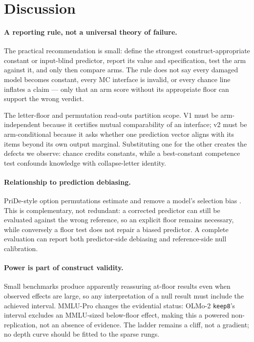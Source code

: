 \section{Discussion}

\paragraph{A reporting rule, not a universal theory of failure.}
The practical recommendation is small: define the strongest construct-appropriate constant or input-blind predictor, report its value and specification, test the arm against it, and only then compare arms. The rule does not say every damaged model becomes constant, every MC interface is invalid, or every chance line inflates a claim --- only that an arm score without its appropriate floor can support the wrong verdict.

The letter-floor and permutation read-outs partition scope. V1 must be arm-independent because it certifies mutual comparability of an interface; v2 must be arm-conditional because it asks whether one prediction vector aligns with its items beyond its own output marginal. Substituting one for the other creates the defects we observe: chance credits constants, while a best-constant competence test confounds knowledge with collapse-letter identity.

\paragraph{Relationship to prediction debiasing.}
PriDe-style option permutations estimate and remove a model's selection bias \citep{zheng2024selectors}. This is complementary, not redundant: a corrected predictor can still be evaluated against the wrong reference, so an explicit floor remains necessary, while conversely a floor test does not repair a biased predictor. A complete evaluation can report both predictor-side debiasing and reference-side null calibration.

\paragraph{Power is part of construct validity.}
Small benchmarks produce apparently reassuring at-floor results even when observed effects are large, so any interpretation of a null result must include the achieved interval. MMLU-Pro changes the evidential status: OLMo-2 \texttt{keep8}'s interval excludes an MMLU-sized below-floor effect, making this a powered non-replication, not an absence of evidence. The ladder remains a cliff, not a gradient; no depth curve should be fitted to the sparse rungs.

